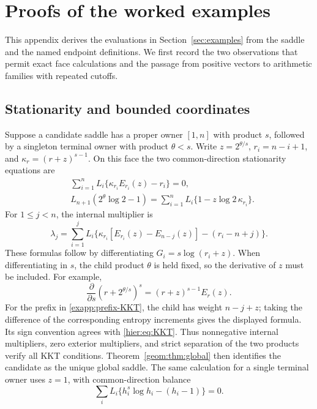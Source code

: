 \section{Proofs of the worked examples}\label{app:examples}

This appendix derives the evaluations in Section~\ref{sec:examples}
from the saddle and the named endpoint definitions.  We first record the
two observations that permit exact face calculations and the passage
from positive vectors to arithmetic families with repeated cutoffs.

\subsection{Stationarity and bounded coordinates}

Suppose a candidate saddle has a proper owner \([1,n]\) with product
\(s\), followed by a singleton terminal owner with product \(\theta<s\).
Write \(z=2^{\theta/s}\), \(r_i=n-i+1\), and
\(\kappa_r=(r+z)^{s-1}\).  On this face the two common-direction
stationarity equations are
\begin{align}
 &\sum_{i=1}^n L_i\{\kappa_{r_i}E_{r_i}(z)-r_i\}=0,
 \label{exapp:owner-balance}\\
 &L_{n+1}(2^\theta\log2-1)
   =\sum_{i=1}^nL_i\{1-z\log2\,\kappa_{r_i}\}.
 \label{exapp:child-balance}
\end{align}
For \(1\le j<n\), the internal multiplier is
\begin{equation}
 \lambda_j=
 \sum_{i=1}^j L_i
 \{\kappa_{r_i}[E_{r_i}(z)-E_{n-j}(z)]-(r_i-n+j)\}.
 \label{exapp:prefix-KKT}
\end{equation}
These formulas follow by differentiating \(G_i=s\log(r_i+z)\).
When differentiating in \(s\), the child product \(\theta\) is held
fixed, so the derivative of \(z\) must be included.  For example,
\[
 \frac{\partial}{\partial s}(r+2^{\theta/s})^s
       =(r+z)^{s-1}E_r(z).
\]
For the prefix in \eqref{exapp:prefix-KKT}, the child has weight
\(n-j+z\); taking the difference of the corresponding entropy
increments gives the displayed formula.  Its sign convention agrees
with \eqref{hier:eq:KKT}.  Thus nonnegative internal multipliers,
zero exterior multipliers, and strict separation of the two products
verify all KKT conditions.  Theorem~\ref{geom:thm:global} then identifies
the candidate as the unique global saddle.  The same calculation for a
single terminal owner uses \(z=1\), with common-direction balance
\begin{equation}
 \sum_iL_i\{h_i^s\log h_i-(h_i-1)\}=0.
 \label{exapp:terminal-balance}
\end{equation}

